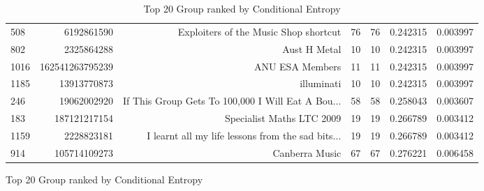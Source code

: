 \documentclass[letterpaper]{article}
\begin{document}
\begin{figure}
\begin{table}
\begin{tabular}{| >{\small}l | >{\small}r | >{\small}r | >{\small}r | >{\small}r | >{\small}r |>{\small}r |}
508  &       6192861590 &              Exploiters of the Music Shop shortcut &    76 &       76 &             0.242315 &            0.003997 \\
802  &       2325864288 &                                       Aust H Metal &    10 &       10 &             0.242315 &            0.003997 \\
1016 &  162541263795239 &                                    ANU ESA Members &    11 &       11 &             0.242315 &            0.003997 \\
1185 &      13913770873 &                                         illuminati &    10 &       10 &             0.242315 &            0.003997 \\
246  &      19062002920 &  If This Group Gets To 100,000 I Will Eat A Bou... &    58 &       58 &             0.258043 &            0.003607 \\
183  &     187121217154 &                          Specialist Maths LTC 2009 &    19 &       19 &             0.266789 &            0.003412 \\
1159 &       2228823181 &  I learnt all my life lessons from the sad bits... &    19 &       19 &             0.266789 &            0.003412 \\
914  &     105714109273 &                                     Canberra Music &    67 &       67 &             0.276221 &            0.006458 \\
\hline
\end{tabular}
\caption{Top 20 Group ranked by Conditional Entropy}
\label {Top 20 Group ranked by Conditional Entropy}
\end{table}


\end{figure}
\end{document}

